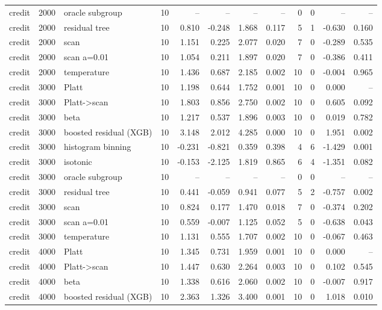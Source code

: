 \begin{tabular}{lllrrrrrrrrr}
credit & 2000 & oracle subgroup & 10 & -- & -- & -- & -- & 0 & 0 & -- & -- \\
credit & 2000 & residual tree & 10 & 0.810 & -0.248 & 1.868 & 0.117 & 5 & 1 & -0.630 & 0.160 \\
credit & 2000 & scan & 10 & 1.151 & 0.225 & 2.077 & 0.020 & 7 & 0 & -0.289 & 0.535 \\
credit & 2000 & scan a=0.01 & 10 & 1.054 & 0.211 & 1.897 & 0.020 & 7 & 0 & -0.386 & 0.411 \\
credit & 2000 & temperature & 10 & 1.436 & 0.687 & 2.185 & 0.002 & 10 & 0 & -0.004 & 0.965 \\
credit & 3000 & Platt & 10 & 1.198 & 0.644 & 1.752 & 0.001 & 10 & 0 & 0.000 & -- \\
credit & 3000 & Platt->scan & 10 & 1.803 & 0.856 & 2.750 & 0.002 & 10 & 0 & 0.605 & 0.092 \\
credit & 3000 & beta & 10 & 1.217 & 0.537 & 1.896 & 0.003 & 10 & 0 & 0.019 & 0.782 \\
credit & 3000 & boosted residual (XGB) & 10 & 3.148 & 2.012 & 4.285 & 0.000 & 10 & 0 & 1.951 & 0.002 \\
credit & 3000 & histogram binning & 10 & -0.231 & -0.821 & 0.359 & 0.398 & 4 & 6 & -1.429 & 0.001 \\
credit & 3000 & isotonic & 10 & -0.153 & -2.125 & 1.819 & 0.865 & 6 & 4 & -1.351 & 0.082 \\
credit & 3000 & oracle subgroup & 10 & -- & -- & -- & -- & 0 & 0 & -- & -- \\
credit & 3000 & residual tree & 10 & 0.441 & -0.059 & 0.941 & 0.077 & 5 & 2 & -0.757 & 0.002 \\
credit & 3000 & scan & 10 & 0.824 & 0.177 & 1.470 & 0.018 & 7 & 0 & -0.374 & 0.202 \\
credit & 3000 & scan a=0.01 & 10 & 0.559 & -0.007 & 1.125 & 0.052 & 5 & 0 & -0.638 & 0.043 \\
credit & 3000 & temperature & 10 & 1.131 & 0.555 & 1.707 & 0.002 & 10 & 0 & -0.067 & 0.463 \\
credit & 4000 & Platt & 10 & 1.345 & 0.731 & 1.959 & 0.001 & 10 & 0 & 0.000 & -- \\
credit & 4000 & Platt->scan & 10 & 1.447 & 0.630 & 2.264 & 0.003 & 10 & 0 & 0.102 & 0.545 \\
credit & 4000 & beta & 10 & 1.338 & 0.616 & 2.060 & 0.002 & 10 & 0 & -0.007 & 0.917 \\
credit & 4000 & boosted residual (XGB) & 10 & 2.363 & 1.326 & 3.400 & 0.001 & 10 & 0 & 1.018 & 0.010 \\

\end{tabular}
